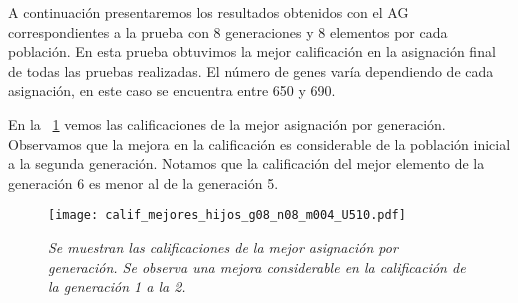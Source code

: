 A continuación presentaremos los resultados obtenidos con el AG correspondientes a la prueba con 8 generaciones y 8 elementos por cada población. En esta prueba obtuvimos la mejor calificación en la asignación final de todas las pruebas realizadas. El número de genes varía dependiendo de cada asignación, en este caso se encuentra entre 650 y 690.


%
%
%



En la \figurename{~\ref{EjcalifMejoresHijos}} vemos las calificaciones de la mejor asignación por generación. Observamos que la mejora en la calificación es considerable de la población inicial a la segunda generación. Notamos que la calificación del mejor elemento de la generación 6 es menor al de la generación 5.


\begin{figure}[H]
\centering
\texttt{[image: calif\_mejores\_hijos\_g08\_n08\_m004\_U510.pdf]} %
\caption[\textit{Calificaciones de mejores asignaciones}]{\textit{Se muestran las calificaciones de la mejor asignación por generación. Se observa una mejora considerable en la calificación de la generación 1 a la 2.}}\label{EjcalifMejoresHijos}
\end{figure}

%

%


